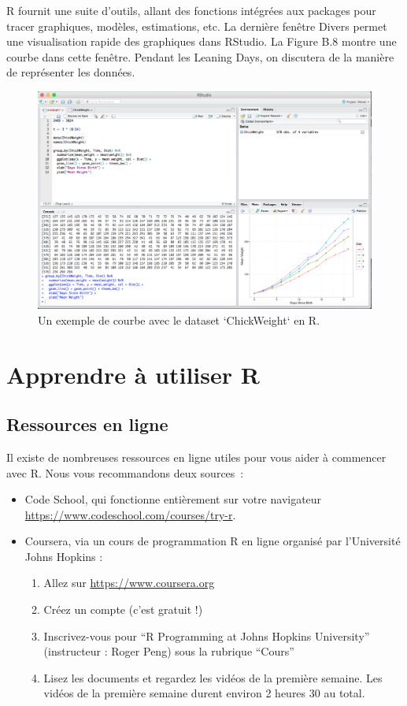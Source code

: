 \documentclass[12pt,]{book}
\providecommand{\tightlist}{%
  \setlength{\itemsep}{0pt}\setlength{\parskip}{0pt}}
\begin{document}
R fournit une suite d'outils, allant des fonctions intégrées aux packages pour tracer graphiques, modèles, estimations, etc. La dernière fenêtre Divers permet une visualisation rapide des graphiques dans RStudio. La Figure B.8 montre une courbe dans cette fenêtre. Pendant les Leaning Days, on discutera de la manière de représenter les données.

\begin{figure}
\includegraphics[width=0.6\linewidth]{Images/graph} \caption{Un exemple de courbe avec le dataset `ChickWeight` en R.}\label{fig:graph}
\end{figure}

\hypertarget{apprendre-uxe0-utiliser-r}{%
\section{Apprendre à utiliser R}\label{apprendre-uxe0-utiliser-r}}

\hypertarget{ressources-en-ligne}{%
\subsection{Ressources en ligne}\label{ressources-en-ligne}}

Il existe de nombreuses ressources en ligne utiles pour vous aider à commencer avec R. Nous vous recommandons deux sources~:

\begin{itemize}
\tightlist
\item
  Code School, qui fonctionne entièrement sur votre navigateur \url{https://www.codeschool.com/courses/try-r}.
\item
  Coursera, via un cours de programmation R en ligne organisé par l'Université Johns Hopkins :

  \begin{enumerate}
  \def\labelenumi{\roman{enumi}.}
  \tightlist
  \item
    Allez sur \url{https://www.coursera.org}
  \item
    Créez un compte (c'est gratuit !)
  \item
    Inscrivez-vous pour ``R Programming at Johns Hopkins University'' (instructeur : Roger Peng) sous la rubrique ``Cours''
  \item
    Lisez les documents et regardez les vidéos de la première semaine. Les vidéos de la première semaine durent environ 2 heures 30 au total.
  \end{enumerate}
\end{itemize}
\end{document}
